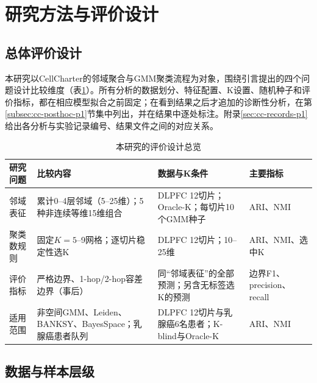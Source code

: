 \section{研究方法与评价设计}
\label{sec:cc-methods-p1}

\subsection{总体评价设计}
\label{subsec:cc-design-p1}
本研究以CellCharter的邻域聚合与GMM聚类流程为对象，围绕引言提出的四个问题设计比较维度（表\ref{tab:cc-design-p1}）。所有分析的数据划分、特征配置、K设置、随机种子和评价指标，都在相应模型拟合之前固定；在看到结果之后才追加的诊断性分析，在第\ref{subsec:cc-posthoc-p1}节集中列出，并在结果中逐处标注。附录\ref{sec:cc-records-p1}给出各分析与实验记录编号、结果文件之间的对应关系。

\begin{table}[htbp]
\centering
\caption{本研究的评价设计总览}
\label{tab:cc-design-p1}
\small
\begin{tabularx}{\linewidth}{p{2.2cm}XXp{2.1cm}}
\toprule
研究问题 & 比较内容 & 数据与K条件 & 主要指标\\
\midrule
邻域表征 & 累计0--4层邻域（5--25维）；5种非连续等维15维组合 & DLPFC 12切片；Oracle-K；每切片10个GMM种子 & ARI、NMI\\
聚类数规则 & 固定$K=5$--9网格；逐切片稳定性选K & DLPFC 12切片；10--25维 & ARI、NMI、选中K\\
评价指标 & 严格边界、1-hop/2-hop容差边界（事后） & 同“邻域表征”的全部预测；另含无标签选K的预测 & 边界F1、precision、recall\\
适用范围 & 非空间GMM、Leiden、BANKSY、BayesSpace；乳腺癌患者队列 & DLPFC 12切片与乳腺癌6名患者；K-blind与Oracle-K & ARI、NMI\\
\bottomrule
\end{tabularx}
\end{table}

\subsection{数据与样本层级}
\label{subsec:cc-data-p1}
